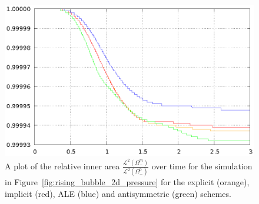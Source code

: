 \begin{figure}[htbp]
\centering
\includegraphics[width=.45\textwidth]
{figures/navier_stokes/2d_rising_bubble_inner_volume.ps}
\caption[Navier--Stokes 2d rising bubble inner area]
{A plot of the relative inner area
$\frac{\mathcal{L}^2(\Omega^m_-)}{\mathcal{L}^2(\Omega^0_-)}$ over time for the
simulation in Figure~\ref{fig:rising_bubble_2d_pressure} for the explicit
(orange), implicit (red), ALE (blue) and antisymmetric (green) schemes.}
\label{fig:rising_bubble_2d_bulk_inner_volume}
\end{figure}
